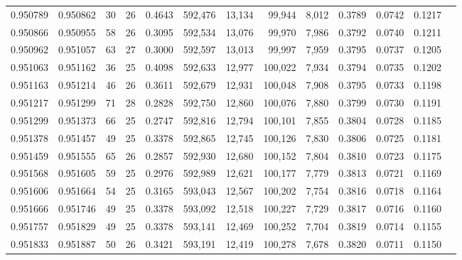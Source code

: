 \begin{tabular}{rrrrrrrrrrrrr}
0.950789 & 0.950862 &    30 &  26 &                                     0.4643 & 592,476 &  13,134 &  99,944 &   8,012 & 0.3789 & 0.0742 & 0.1217 \\
0.950866 & 0.950955 &    58 &  26 &                                     0.3095 & 592,534 &  13,076 &  99,970 &   7,986 & 0.3792 & 0.0740 & 0.1211 \\
0.950962 & 0.951057 &    63 &  27 &                                     0.3000 & 592,597 &  13,013 &  99,997 &   7,959 & 0.3795 & 0.0737 & 0.1205 \\
0.951063 & 0.951162 &    36 &  25 &                                     0.4098 & 592,633 &  12,977 & 100,022 &   7,934 & 0.3794 & 0.0735 & 0.1202 \\
0.951163 & 0.951214 &    46 &  26 &                                     0.3611 & 592,679 &  12,931 & 100,048 &   7,908 & 0.3795 & 0.0733 & 0.1198 \\
0.951217 & 0.951299 &    71 &  28 &                                     0.2828 & 592,750 &  12,860 & 100,076 &   7,880 & 0.3799 & 0.0730 & 0.1191 \\
0.951299 & 0.951373 &    66 &  25 &                                     0.2747 & 592,816 &  12,794 & 100,101 &   7,855 & 0.3804 & 0.0728 & 0.1185 \\
0.951378 & 0.951457 &    49 &  25 &                                     0.3378 & 592,865 &  12,745 & 100,126 &   7,830 & 0.3806 & 0.0725 & 0.1181 \\
0.951459 & 0.951555 &    65 &  26 &                                     0.2857 & 592,930 &  12,680 & 100,152 &   7,804 & 0.3810 & 0.0723 & 0.1175 \\
0.951568 & 0.951605 &    59 &  25 &                                     0.2976 & 592,989 &  12,621 & 100,177 &   7,779 & 0.3813 & 0.0721 & 0.1169 \\
0.951606 & 0.951664 &    54 &  25 &                                     0.3165 & 593,043 &  12,567 & 100,202 &   7,754 & 0.3816 & 0.0718 & 0.1164 \\
0.951666 & 0.951746 &    49 &  25 &                                     0.3378 & 593,092 &  12,518 & 100,227 &   7,729 & 0.3817 & 0.0716 & 0.1160 \\
0.951757 & 0.951829 &    49 &  25 &                                     0.3378 & 593,141 &  12,469 & 100,252 &   7,704 & 0.3819 & 0.0714 & 0.1155 \\
0.951833 & 0.951887 &    50 &  26 &                                     0.3421 & 593,191 &  12,419 & 100,278 &   7,678 & 0.3820 & 0.0711 & 0.1150 \\

\end{tabular}
